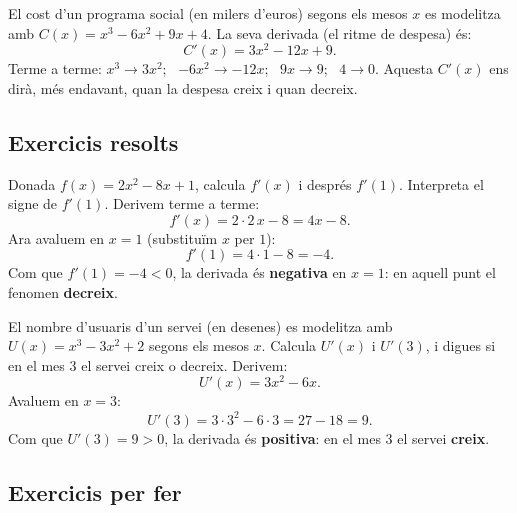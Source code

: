 \begin{exemple}
El cost d'un programa social (en milers d'euros) segons els mesos $x$ es modelitza amb
$C(x)=x^3-6x^2+9x+4$. La seva derivada (el ritme de despesa) és:
\[
C'(x)=3x^2-12x+9.
\]
Terme a terme: $x^3\to 3x^2$; \ $-6x^2\to -12x$; \ $9x\to 9$; \ $4\to 0$. Aquesta
$C'(x)$ ens dirà, més endavant, quan la despesa creix i quan decreix.
\end{exemple}

\subsection{Exercicis resolts}

\begin{exresolt}
Donada $f(x)=2x^2-8x+1$, calcula $f'(x)$ i després $f'(1)$. Interpreta el signe de
$f'(1)$.
\solucio
Derivem terme a terme:
\[
f'(x)=2\cdot 2\,x-8=4x-8.
\]
Ara avaluem en $x=1$ (substituïm $x$ per $1$):
\[
f'(1)=4\cdot 1-8=-4.
\]
Com que $f'(1)=-4<0$, la derivada és \textbf{negativa} en $x=1$: en aquell punt el
fenomen \textbf{decreix}.
\end{exresolt}

\begin{exresolt}
El nombre d'usuaris d'un servei (en desenes) es modelitza amb
$U(x)=x^3-3x^2+2$ segons els mesos $x$. Calcula $U'(x)$ i $U'(3)$, i digues si en el
mes $3$ el servei creix o decreix.
\solucio
Derivem:
\[
U'(x)=3x^2-6x.
\]
Avaluem en $x=3$:
\[
U'(3)=3\cdot 3^2-6\cdot 3=27-18=9.
\]
Com que $U'(3)=9>0$, la derivada és \textbf{positiva}: en el mes $3$ el servei
\textbf{creix}.
\end{exresolt}

\subsection{Exercicis per fer}

